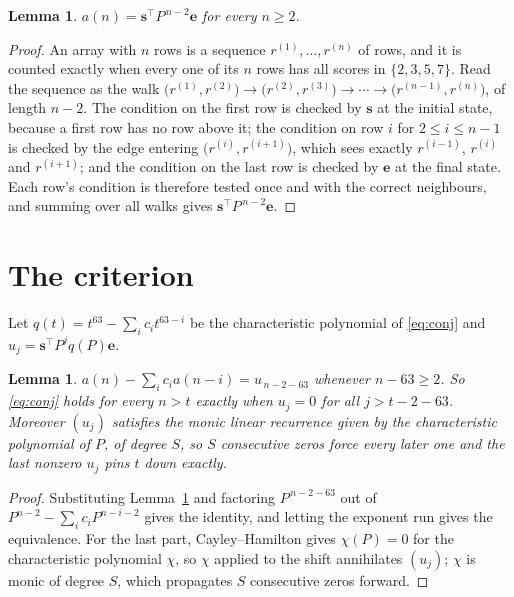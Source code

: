 \documentclass[11pt,a4paper]{article}
\theoremstyle{plain}
\newtheorem{lemma}[theorem]{Lemma}
\theoremstyle{definition}
\begin{document}
\begin{lemma}\label{lem:walk}
$a(n)=\mathbf{s}^{\!\top}P^{\,n-2}\mathbf{e}$ for every $n\ge2$.
\end{lemma}

\begin{proof}
An array with $n$ rows is a sequence $r^{(1)},\dots,r^{(n)}$ of rows, and it is counted
exactly when every one of its $n$ rows has all scores in $\{2,3,5,7\}$. Read the sequence as the
walk $\bigl(r^{(1)},r^{(2)}\bigr)\to\bigl(r^{(2)},r^{(3)}\bigr)\to\cdots\to
\bigl(r^{(n-1)},r^{(n)}\bigr)$, of length $n-2$. The condition on the first row is
checked by $\mathbf{s}$ at the initial state, because a first row has no row above it; the
condition on row $i$ for $2\le i\le n-1$ is checked by the edge entering
$\bigl(r^{(i)},r^{(i+1)}\bigr)$, which sees exactly $r^{(i-1)}$, $r^{(i)}$ and
$r^{(i+1)}$; and the condition on the last row is checked by $\mathbf{e}$ at the final
state. Each row's condition is therefore tested once and with the correct neighbours, and
summing over all walks gives $\mathbf{s}^{\!\top}P^{\,n-2}\mathbf{e}$.
\end{proof}

\section{The criterion}

Let $q(t)=t^{63}-\sum_i c_i t^{63-i}$ be the characteristic polynomial of
\eqref{eq:conj} and $u_j=\mathbf{s}^{\!\top}P^{j}q(P)\mathbf{e}$.

\begin{lemma}\label{lem:crit}
$a(n)-\sum_i c_i a(n-i)=u_{\,n-2-63}$ whenever $n-63\ge2$. So \eqref{eq:conj}
holds for every $n>t$ exactly when $u_j=0$ for all $j>t-2-63$. Moreover $(u_j)$
satisfies the monic linear recurrence given by the characteristic polynomial of $P$, of
degree $S$, so $S$ consecutive zeros force every later one and the last nonzero $u_j$ pins
$t$ down exactly.
\end{lemma}

\begin{proof}
Substituting Lemma~\ref{lem:walk} and factoring $P^{\,n-2-63}$ out of
$P^{n-2}-\sum_i c_i P^{n-i-2}$ gives the identity, and letting the exponent run gives the
equivalence. For the last part, Cayley--Hamilton gives $\chi(P)=0$ for the characteristic
polynomial $\chi$, so $\chi$ applied to the shift annihilates $(u_j)$; $\chi$ is monic of
degree $S$, which propagates $S$ consecutive zeros forward.
\end{proof}
\end{document}
